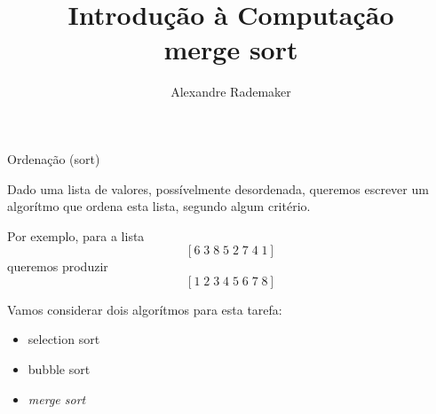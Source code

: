 \documentclass{beamer}
\title{Introdução à Computação \\ merge sort}
\author{Alexandre Rademaker}
\date{}
\begin{document}
\begin{frame}
 \maketitle
\end{frame}


\begin{frame}{Ordenação (sort)}

  Dado uma lista de valores, possívelmente desordenada, queremos
  escrever um algorítmo que ordena esta lista, segundo algum critério.

  Por exemplo, para a lista
  \[
    [ 6 \; 3 \; 8 \; 5 \; 2 \; 7 \; 4 \; 1 ]
  \]
  queremos produzir
  \[
    [ 1 \; 2 \; 3 \; 4 \; 5 \; 6 \; 7 \; 8 ]
  \]

  \framebreak

  Vamos considerar dois algorítmos para esta tarefa:

  \begin{itemize}
  \item selection sort
  \item bubble sort
  \item \emph{merge sort}
  \end{itemize}

\end{frame}
\end{document}
